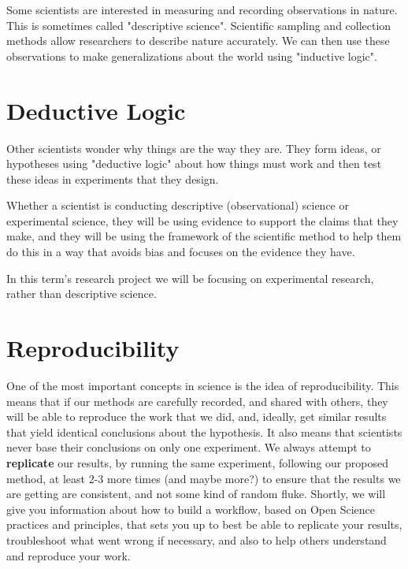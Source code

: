 \documentclass[
]{book}
\begin{document}
Some scientists are interested in measuring and recording observations in nature. This is sometimes called "descriptive science". Scientific sampling and collection methods allow researchers to describe nature accurately. We can then use these observations to make generalizations about the world using "inductive logic".

\hypertarget{deductive-logic}{%
\section*{Deductive Logic}\label{deductive-logic}}

Other scientists wonder why things are the way they are. They form ideas, or hypotheses using "deductive logic" about how things must work and then test these ideas in experiments that they design.

Whether a scientist is conducting descriptive (observational) science or experimental science, they will be using evidence to support the claims that they make, and they will be using the framework of the scientific method to help them do this in a way that avoids bias and focuses on the evidence they have.

In this term's research project we will be focusing on experimental research, rather than descriptive science.

\hypertarget{reproducibility}{%
\section*{Reproducibility}\label{reproducibility}}

One of the most important concepts in science is the idea of reproducibility. This means that if our methods are carefully recorded, and shared with others, they will be able to reproduce the work that we did, and, ideally, get similar results that yield identical conclusions about the hypothesis. It also means that scientists never base their conclusions on only one experiment. We always attempt to \textbf{replicate} our results, by running the same experiment, following our proposed method, at least 2-3 more times (and maybe more?) to ensure that the results we are getting are consistent, and not some kind of random fluke. Shortly, we will give you information about how to build a workflow, based on Open Science practices and principles, that sets you up to best be able to replicate your results, troubleshoot what went wrong if necessary, and also to help others understand and reproduce your work.
\end{document}
